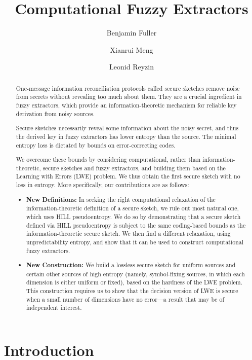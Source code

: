 \documentclass[11pt]{article}
\title{\textbf{Computational Fuzzy Extractors}}
\author{Benjamin Fuller%
 \and Xianrui Meng \and Leonid Reyzin}
\begin{document}
\maketitle

\begin{abstract} 
One-message information reconciliation protocols called secure sketches remove noise
from secrets without revealing too much about them.  They are a crucial ingredient in
fuzzy extractors, which provide an information-theoretic mechanism for reliable key derivation from noisy sources.

Secure sketches necessarily reveal some information about the noisy secret, and thus the derived key in fuzzy extractors has lower entropy than the source.  The minimal entropy loss is dictated by bounds on error-correcting codes.

We overcome these bounds by considering computational, rather than information-theoretic, secure sketches and fuzzy extractors, and building them based on the Learning with Errors (LWE) problem.  We thus obtain the first secure sketch with no loss in entropy.   More specifically, our contributions are as follows:

\begin{itemize}
\item \textbf{New Definitions:} In seeking the right computational relaxation of the information-theoretic definition of a secure sketch, we rule out most natural one, which uses HILL pseudoentropy.  We do so by demonstrating that a secure sketch defined via HILL pseudoentropy is subject to the same coding-based  bounds as the information-theoretic secure sketch.  We then find a different relaxation, using unpredictability entropy, and show that it can be used to construct computational fuzzy extractors.

\item \textbf{New Construction:} We build a lossless secure sketch for uniform sources and certain other sources of high entropy (namely, symbol-fixing sources, in which each dimension is either uniform or fixed),  based on the hardness of the LWE problem.  This construction requires us to show that the decision version of LWE is secure when a small number of dimensions have no error---a result that may be of independent interest.
\end{itemize}
\end{abstract}

\newcommand{\M}{\mathcal{M}}
\section{Introduction}\label{sec:introduction}
\end{document}
